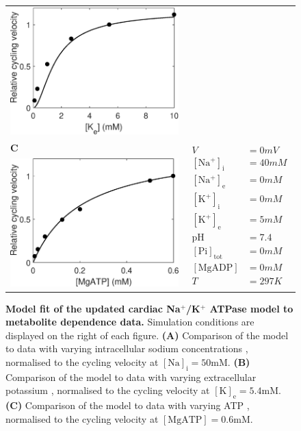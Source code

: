\documentclass[fleqn,10pt]{physiome}
\begin{document}
\begin{figure}
\begin{tabular}{l c}
		\includegraphics[width=0.4\linewidth]{Terkildsen_fit_NG_Ke_comparison.eps} & \\[0.2cm]  
		{\Large\textbf{C}} & \multirow{2}{0.4\linewidth}[1cm]{
			\begin{minipage}{\linewidth}
				\small
				\begin{align*}
				V &= 0\si{mV}\\ 
				\mathrm{[Na^+]_i} &= 40\si{mM}\\ 
				\mathrm{[Na^+]_e} &= 0\si{mM}\\ 
				\mathrm{[K^+]_i} &= 0\si{mM}\\ 
				\mathrm{[K^+]_e} &= 5\si{mM}\\ 
				\mathrm{pH} &= 7.4\\ 
				\mathrm{[Pi]_{tot}} &= 0\si{mM}\\ 
				\mathrm{[MgADP]} &= 0\si{mM}\\ 
				T &= 297\si{K}
				\end{align*}
		\end{minipage}}\\  
		\includegraphics[width=0.4\linewidth]{Terkildsen_fit_Friedrich_MgATP_comparison.eps} & 
	\end{tabular}
	\caption{\textbf{Model fit of the updated cardiac Na$^+$/K$^+$ ATPase model to metabolite dependence data.} Simulation conditions are displayed on the right of each figure. \textbf{(A)} Comparison of the model to data with varying intracellular sodium concentrations \citep[Fig. 7(a)]{hansen_dependence_2002}, normalised to the cycling velocity at $\mathrm{[Na]_i = 50\si{mM}}$. \textbf{(B)} Comparison of the model to data with varying extracellular potassium \citep[Fig. 11(a)]{nakao_[na]_1989}, normalised to the cycling velocity at $\mathrm{[K]_e = 5.4\si{mM}}$. \textbf{(C) } Comparison of the model to data with varying ATP \citep[Fig. 3(b)]{friedrich_na+k+-atpase_1996}, normalised to the cycling velocity at $\mathrm{[MgATP] = 0.6\si{mM}}$.}
	\label{fig:metabolite_dependence}
\end{figure}
\end{document}
